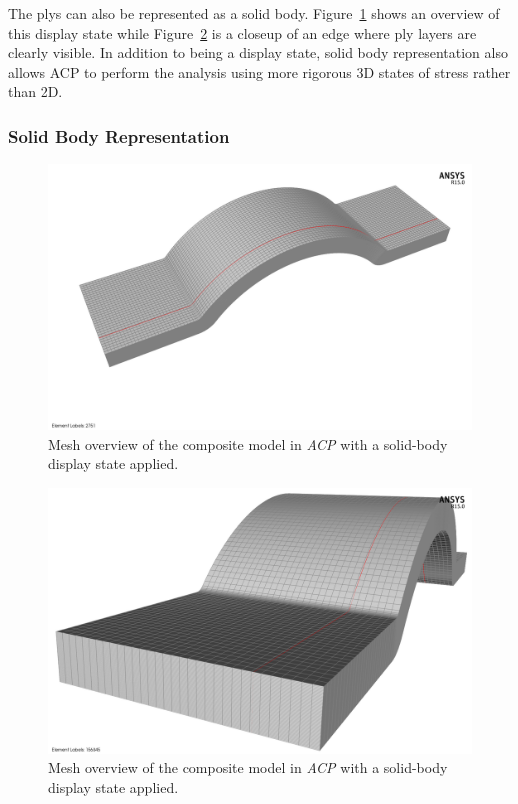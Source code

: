 \clearpage

\indent

The plys can also be represented as a solid body. Figure~\ref{fig:fea-acp-solidmodel-mesh} shows an overview of this display state while Figure~\ref{fig:fea-acp-solidmodel-closeup} is a closeup of an edge where ply layers are clearly visible. In addition to being a display state, solid body representation also allows ACP to perform the analysis using more rigorous 3D states of stress rather than 2D.\\

\subsubsection{Solid Body Representation}

\begin{figure}[htp]
\centering
\includegraphics[width=1\textwidth]{./figures/fea/fea-acp-solidmodel-mesh}
\caption{Mesh overview of the composite model in \textit{ACP} with a solid-body display state applied.}
\label{fig:fea-acp-solidmodel-mesh}
\end{figure}

\begin{figure}[htp]
\centering
\includegraphics[width=1\textwidth]{./figures/fea/fea-acp-solidmodel-closeup}
\caption{Mesh overview of the composite model in \textit{ACP} with a solid-body display state applied.}
\label{fig:fea-acp-solidmodel-closeup}
\end{figure}

